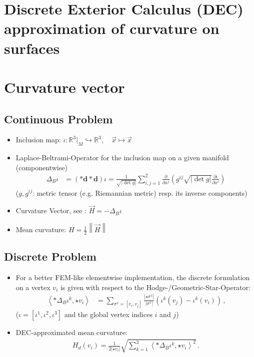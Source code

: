 \documentclass{scrartcl}
\newcommand{\R}{\mathds{R}}
\newcommand{\exd}{\mathbf{d}}
\newcommand{\formpunkt}{\,\text{.}}
\newcommand{\formkomma}{\,\text{,}}
\begin{document}
\pagestyle{empty}
\section*{Discrete Exterior Calculus (DEC) \\approximation of curvature on surfaces}
\pagebreak
\section*{Curvature vector}
\subsection*{Continuous Problem}
\begin{itemize}
  \item Inclusion map: \( \iota: \R^{3}|_{M} \hookrightarrow \R^{3},\quad \vec{x} \mapsto \vec{x}  \)
  \item Laplace-Beltrami-Operator for the inclusion map on a given manifold (componentwise)
      \begin{align*}
      \Delta_{B} \iota &= \left(* \exd * \exd  \right)  \iota
        = \frac{1}{\sqrt{\left| \det g \right|}} \sum_{i,j=1}^{2} \frac{\partial}{\partial x^{j}} \left( g^{ij}\sqrt{\left| \det g \right|} \frac{\partial\iota}{\partial x^{i}}
      \right)
      \end{align*}
  (\( g, g^{ij} \): metric tensor (e.g. Riemannian metric) resp. its inverse components)
  \item Curvature Vector, see \cite{flanders}:  \( \vec{H} = -\Delta_{B}\iota \)
  \item Mean curvature: \( H = \frac{1}{2}\left\| \vec{H} \right\| \)
\end{itemize}

\subsection*{Discrete Problem}
\begin{itemize}
  \item For a better FEM-like elementwise implementation, the discrete formulation on a vertex \( v_{i} \) is given with respect to the Hodge-/Geometric-Star-Operator:
    \begin{align*}
              \left\langle *\Delta_{B} \iota^{k} , \star v_{i} \right\rangle
                     &= \sum_{\sigma^{1}=\left[ v_{i}, v_{j} \right]} 
                     \frac{\left| \star\sigma^{1} \right|}{\left| \sigma^{1} \right|}
                      \left( \iota^{k}(v_{j}) - \iota^{k}(v_{i}) \right)\formkomma
    \end{align*}
    (\( \iota = \left[ \iota^{1}, \iota^{2}, \iota^{3} \right] \) and the global vertex indices \( i \) and \( j \))
  \item DEC-approximated mean curvature:
    \begin{align*}
  H_{d}(v_{i}) = \frac{1}{2\left| \star v_{i} \right|} \sqrt{\sum_{k=1}^{3} \left\langle *\Delta_{B} \iota^{k} , \star v_{i} \right\rangle^{2}} \formpunkt
    \end{align*}
\end{itemize}
\end{document}
